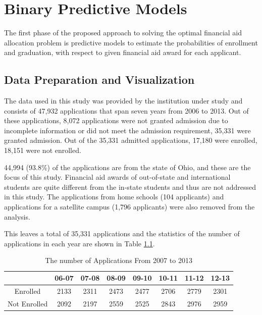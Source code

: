 \documentclass[12pt,english]{report}
\begin{document}
\chapter{Binary Predictive Models } %
The first phase of the proposed approach to solving the optimal financial aid
allocation
problem is predictive models to estimate the probabilities of enrollment and
graduation,
with respect to given financial aid award for each applicant.
\section{Data Preparation and Visualization}
The data used in this study was provided by the institution under study and
consists of
47,932 applications that span seven years from 2006 to 2013. Out of these
applications,
8,072 applications were not granted admission due to incomplete information or
did not
meet the admission requirement, 35,331 were granted admission. Out of the
35,331 admitted
applications, 17,180 were enrolled, 18,151 were not enrolled.

44,994 (93.8\%) of the applications are from the state of Ohio, and these are
the focus
of this study. Financial aid awards of out-of-state and international students
are quite
different from the in-state students and thus are not addressed in this study.
The applications
from home schools (104 applicants) and applications for a satellite campus
(1,796 applicants) 
were also removed from the analysis.

This leaves a total of 35,331 applications and the statistics of the number of
applications
in each year are shown in Table \ref{enroll_year_sum}.

\begin{table}[ht]
\centering
\begin{tabular}{|c|c|c|c|c|c|c|c|}
\hline
          & 06-07 & 07-08 & 08-09 & 09-10 & 10-11 & 11-12 & 12-13 \\ \hline
Enrolled  & 2133  & 2311  & 2473  & 2477  & 2706  & 2779  & 2301  \\
\hline
Not Enrolled   & 2092  & 2197  & 2559  & 2525  & 2843  & 2976  & 2959
\\ \hline
\end{tabular}
\caption{The number of Applications From 2007 to 2013}
\label{enroll_year_sum}
\end{table}
\end{document}
